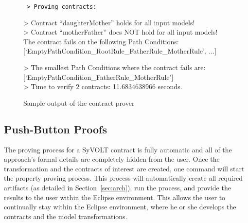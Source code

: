 

\begin{figure}

\scriptsize
\tt
> Proving contracts:

> Contract ``daughterMother'' holds for all input models!
\\
> Contract ``motherFather'' does NOT hold for all input models! The contract
fails on the following Path Conditions:
[`EmptyPathCondition\_RootRule\_FatherRule\_MotherRule', ...]

> The smallest Path Conditions where the contract fails are:
[`EmptyPathCondition\_FatherRule\_MotherRule']
\\
> Time to verify 2 contracts: 11.6834638966 seconds.
\caption{Sample output of the contract prover}
\label{fig:output}
\vspace{-.5cm}
\end{figure}

\subsection{Push-Button Proofs}
\label{sec:push_button_proofs}
The proving process for a SyVOLT contract is fully automatic and all of the
approach's formal details are completely hidden from the user. Once the
transformation and the contracts of interest are created, one command will start
the property proving process. This process will automatically create all
required artifacts (as detailed in Section~\ref{sec:arch}), run the process, and
provide the results to the user within the Eclipse environment. This allows the user to continually stay within the
Eclipse environment, where he or she develops the contracts and the
model transformations.


